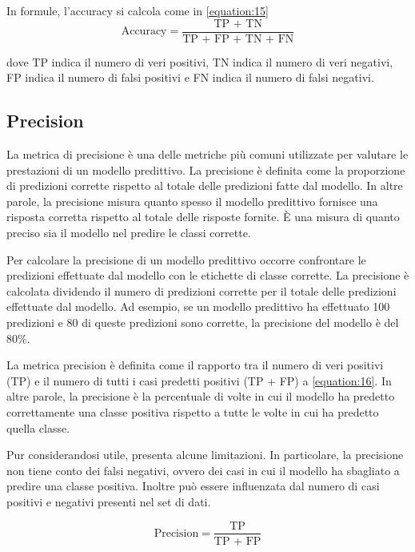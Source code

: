 In formule, l'accuracy si calcola come in \ref{equation:15}
\begin{equation}
    \text{Accuracy} = \frac{\text{TP + TN}}{\text{TP + FP + TN + FN}}
    \label{equation:15}
\end{equation}

dove TP indica il numero di veri positivi, TN indica il numero di veri negativi, FP indica il numero di falsi positivi e FN indica il numero di falsi negativi.

\subsection{Precision}
La metrica di precisione è una delle metriche più comuni utilizzate per valutare le prestazioni di un modello predittivo. La precisione è definita come la proporzione di predizioni corrette rispetto al totale delle predizioni fatte dal modello. In altre parole, la precisione misura quanto spesso il modello predittivo fornisce una risposta corretta rispetto al totale delle risposte fornite. È una misura di quanto preciso sia il modello nel predire le classi corrette.

Per calcolare la precisione di un modello predittivo occorre confrontare le predizioni effettuate dal modello con le etichette di classe corrette. La precisione è calcolata dividendo il numero di predizioni corrette per il totale delle predizioni effettuate dal modello. Ad esempio, se un modello predittivo ha effettuato 100 predizioni e 80 di queste predizioni sono corrette, la precisione del modello è del 80\%.

La metrica precision è definita come il rapporto tra il numero di veri positivi (TP) e il numero di tutti i casi predetti positivi (TP + FP) a \ref{equation:16}. In altre parole, la precisione è la percentuale di volte in cui il modello ha predetto correttamente una classe positiva rispetto a tutte le volte in cui ha predetto quella classe.

Pur considerandosi utile, presenta alcune limitazioni. In particolare, la precisione non tiene conto dei falsi negativi, ovvero dei casi in cui il modello ha sbagliato a predire una classe positiva. Inoltre può essere influenzata dal numero di casi positivi e negativi presenti nel set di dati.

\begin{equation}
    \text{Precision} = \frac{\text{TP}}{\text{TP + FP}}
    \label{equation:16}
\end{equation}

